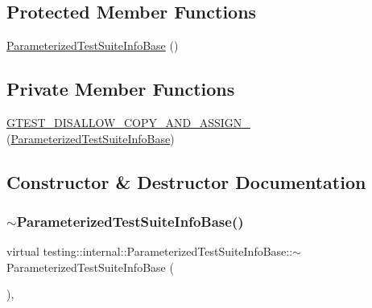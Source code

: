 \subsection*{Protected Member Functions}
\begin{DoxyCompactItemize}
\item 
\hyperlink{classtesting_1_1internal_1_1ParameterizedTestSuiteInfoBase_a3b50ae419b0de858f3ad9b8dd49989de}{Parameterized\+Test\+Suite\+Info\+Base} ()
\end{DoxyCompactItemize}
\subsection*{Private Member Functions}
\begin{DoxyCompactItemize}
\item 
\hyperlink{classtesting_1_1internal_1_1ParameterizedTestSuiteInfoBase_a49431b7df609223c2a7fea67367e1d00}{G\+T\+E\+S\+T\+\_\+\+D\+I\+S\+A\+L\+L\+O\+W\+\_\+\+C\+O\+P\+Y\+\_\+\+A\+N\+D\+\_\+\+A\+S\+S\+I\+G\+N\+\_\+} (\hyperlink{classtesting_1_1internal_1_1ParameterizedTestSuiteInfoBase}{Parameterized\+Test\+Suite\+Info\+Base})
\end{DoxyCompactItemize}


\subsection{Constructor \& Destructor Documentation}
\mbox{\label{classtesting_1_1internal_1_1ParameterizedTestSuiteInfoBase_ac2aa0664f56e84cacab823d345c7d67b}} 
\subsubsection{\texorpdfstring{$\sim$\+Parameterized\+Test\+Suite\+Info\+Base()}{~ParameterizedTestSuiteInfoBase()}}
{\footnotesize\ttfamily virtual testing\+::internal\+::\+Parameterized\+Test\+Suite\+Info\+Base\+::$\sim$\+Parameterized\+Test\+Suite\+Info\+Base (\begin{DoxyParamCaption}{ }\end{DoxyParamCaption})\hspace{0.3cm}{\ttfamily [inline]}, {\ttfamily [virtual]}}


